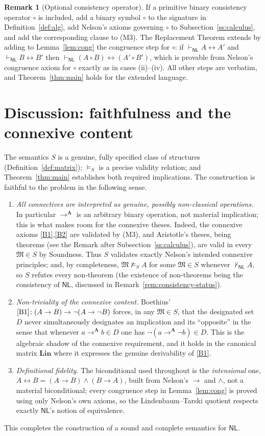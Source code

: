 \documentclass[12pt]{article}
\theoremstyle{definition}
\newtheorem{remark}{Remark}
\newcommand{\NL}{\mathsf{NL}}
\newcommand{\prv}{\vdash_{\NL}}
\newcommand{\vld}{\vDash}
\newcommand{\imp}{\rightarrow}
\newcommand{\bic}{\leftrightarrow}
\newcommand{\A}{\mathbf{A}}
\newcommand{\Lin}{\mathbf{Lin}}
\begin{document}
\begin{remark}[Optional consistency operator]\label{rem:consistency}
If a primitive binary consistency operator $\circ$ is included, add a binary
symbol $\circ$ to the signature in Definition~\ref{def:alg}, add Nelson's axioms
governing $\circ$ to Subsection~\ref{ss:calculus}, and add the corresponding
clause to (M3). The Replacement Theorem extends by adding to
Lemma~\ref{lem:cong} the congruence step for $\circ$: if $\prv A\bic A'$ and
$\prv B\bic B'$ then $\prv (A\circ B)\bic(A'\circ B')$, which is provable from
Nelson's congruence axiom for $\circ$ exactly as in cases (ii)--(iv). All other
steps are verbatim, and Theorem~\ref{thm:main} holds for the extended language.
\end{remark}

\section{Discussion: faithfulness and the connexive content}

The semantics $S$ is a genuine, fully specified class of structures
(Definition~\ref{def:matrix}); $\vld_{S}$ is a precise validity relation; and
Theorem~\ref{thm:main} establishes both required implications. The construction
is faithful to the problem in the following sense.

\begin{enumerate}
\item \emph{All connectives are interpreted as genuine, possibly
non-classical operations.} In particular $\imp^{\A}$ is an arbitrary binary
operation, not material implication; this is what makes room for the connexive
theses. Indeed, the connexive axioms \eqref{B1},\eqref{B2} are validated by
(M3), and Aristotle's theses, being theorems (see the Remark after
Subsection~\ref{ss:calculus}), are valid in every $\mathfrak M\in S$ by
Soundness. Thus $S$ validates exactly Nelson's intended connexive principles;
and, by completeness, $\mathfrak M\not\vld_S A$ for some $\mathfrak M\in S$
whenever $\not\prv A$, so $S$ refutes every non-theorem (the existence of
non-theorems being the consistency of $\NL$, discussed in
Remark~\ref{rem:consistency-status}).

\item \emph{Non-triviality of the connexive content.} Boethius'
$\eqref{B1}\!:(A\imp B)\imp\neg(A\imp\neg B)$ forces, in any $\mathfrak M\in S$,
that the designated set $D$ never simultaneously designates an implication and
its ``opposite'' in the sense that whenever $a\imp^{\A}b\in D$ one has
$\neg(a\imp^{\A}\neg b)\in D$. This is the algebraic shadow of the connexive
requirement, and it holds in the canonical matrix $\Lin$ where it expresses the
genuine derivability of \eqref{B1}.

\item \emph{Definitional fidelity.} The biconditional used throughout is the
\emph{intensional} one, $A\bic B=(A\imp B)\wedge(B\imp A)$, built from Nelson's
$\imp$ and $\wedge$, not a material biconditional; every congruence step in
Lemma~\ref{lem:cong} is proved using only Nelson's own axioms, so the
Lindenbaum--Tarski quotient respects exactly $\NL$'s notion of equivalence.
\end{enumerate}

This completes the construction of a sound and complete semantics for $\NL$.
\end{document}
